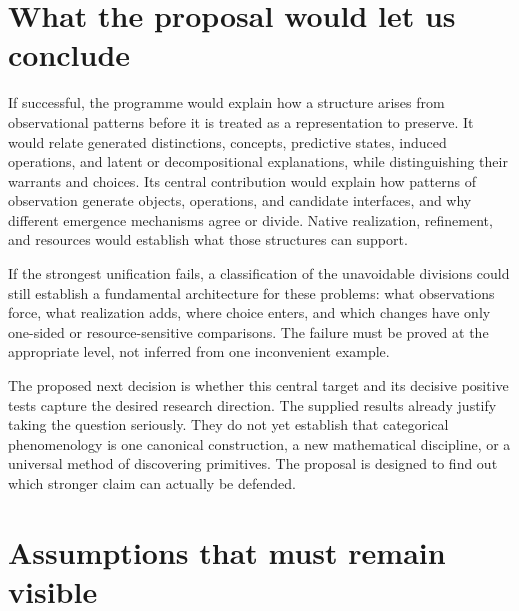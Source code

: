 \documentclass[11pt]{article}
\theoremstyle{remark}
\begin{document}
\section{What the proposal would let us conclude}
\label{sec:conclusion}

If successful, the programme would explain how a structure arises from observational patterns before it is treated as a representation to preserve. It would relate generated distinctions, concepts, predictive states, induced operations, and latent or decompositional explanations, while distinguishing their warrants and choices. Its central contribution would explain how patterns of observation generate objects, operations, and candidate interfaces, and why different emergence mechanisms agree or divide. Native realization, refinement, and resources would establish what those structures can support.

If the strongest unification fails, a classification of the unavoidable divisions could still establish a fundamental architecture for these problems: what observations force, what realization adds, where choice enters, and which changes have only one-sided or resource-sensitive comparisons. The failure must be proved at the appropriate level, not inferred from one inconvenient example.

The proposed next decision is whether this central target and its decisive positive tests capture the desired research direction. The supplied results already justify taking the question seriously. They do not yet establish that categorical phenomenology is one canonical construction, a new mathematical discipline, or a universal method of discovering primitives. The proposal is designed to find out which stronger claim can actually be defended.

\appendix
\section{Assumptions that must remain visible}
\label{app:assumptions}
\end{document}
